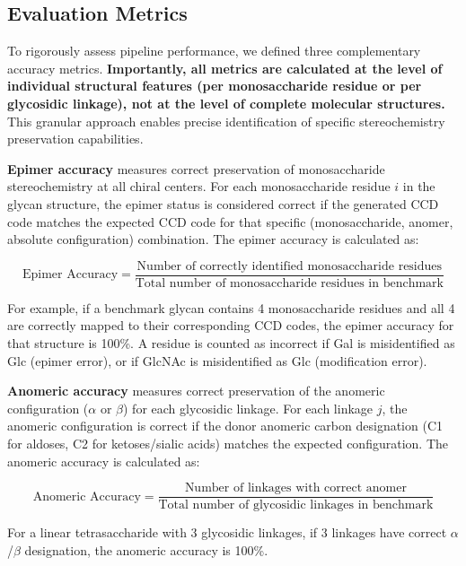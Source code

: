 \subsection{Evaluation Metrics}
\label{sec:metrics}

To rigorously assess pipeline performance, we defined three complementary accuracy metrics. \textbf{Importantly, all metrics are calculated at the level of individual structural features (per monosaccharide residue or per glycosidic linkage), not at the level of complete molecular structures.} This granular approach enables precise identification of specific stereochemistry preservation capabilities.

\textbf{Epimer accuracy} measures correct preservation of monosaccharide stereochemistry at all chiral centers. For each monosaccharide residue $i$ in the glycan structure, the epimer status is considered correct if the generated CCD code matches the expected CCD code for that specific (monosaccharide, anomer, absolute configuration) combination. The epimer accuracy is calculated as:

\begin{equation}
\text{Epimer Accuracy} = \frac{\text{Number of correctly identified monosaccharide residues}}{\text{Total number of monosaccharide residues in benchmark}}
\end{equation}

For example, if a benchmark glycan contains 4 monosaccharide residues and all 4 are correctly mapped to their corresponding CCD codes, the epimer accuracy for that structure is 100\%. A residue is counted as incorrect if Gal is misidentified as Glc (epimer error), or if GlcNAc is misidentified as Glc (modification error).

\textbf{Anomeric accuracy} measures correct preservation of the anomeric configuration ($\alpha$ or $\beta$) for each glycosidic linkage. For each linkage $j$, the anomeric configuration is correct if the donor anomeric carbon designation (C1 for aldoses, C2 for ketoses/sialic acids) matches the expected configuration. The anomeric accuracy is calculated as:

\begin{equation}
\text{Anomeric Accuracy} = \frac{\text{Number of linkages with correct anomer}}{\text{Total number of glycosidic linkages in benchmark}}
\end{equation}

For a linear tetrasaccharide with 3 glycosidic linkages, if 3 linkages have correct $\alpha$/$\beta$ designation, the anomeric accuracy is 100\%.

